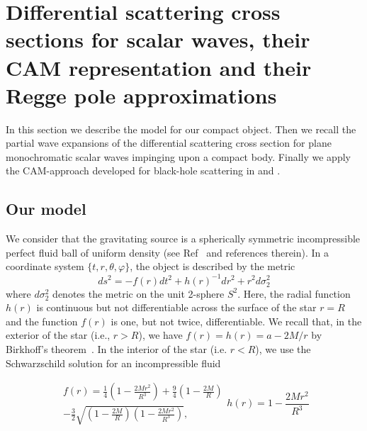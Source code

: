 \documentclass[aps,prd,longbibliography,reprint,twocolumn,amsmath,amssymb,amsfonts,showpacs,superscriptaddress]{revtex4-1}%
\begin{document}
\section{Differential scattering cross sections for scalar waves, their CAM representation and their Regge pole approximations}
\label{SecII}


In this section we describe the model for our compact object. Then we recall the partial wave expansions of the differential scattering cross section for plane monochromatic scalar waves impinging upon a compact body. Finally we apply the CAM-approach developed for black-hole scattering in \cite{Folacci:2019cmc} and \cite{Folacci:2019vtt}.

\subsection{Our model}
\label{SecIIa}

  We consider that the gravitating source is a spherically symmetric incompressible perfect fluid ball of uniform
density (see Ref~\cite{Dolan:2017rtj} and references therein). In a coordinate system $\{t,r,\theta,\varphi\}$, the object is described by the metric
\begin{equation}\label{Line_elem}
  ds^2= -f(r) dt^2+h(r)^{-1}dr^2+r^2d\sigma_2^2
\end{equation}
where $d\sigma_2^2$ denotes the metric on the unit 2-sphere $S^2$. Here, the radial function $h(r)$ is continuous but not differentiable across the surface of the star $r=R$ and the function $f(r)$ is one, but not twice, differentiable. We recall that, in the exterior of the star (i.e., $r>R$), we have $f(r)=h(r)=a-2M/r$ by Birkhoff's theorem~\cite{VojeJohansen:2005nd}. In the interior of the star (i.e. $r<R$), we use the Schwarzschild solution for an incompressible fluid~\cite{Shapiro1983}

\begin{subequations}\label{Interior_Solution}
\begin{align}\label{Interior_Solution_f}
    f(r) =\frac{1}{4}\left(1-\frac{2 M r^2}{R^3}\right)+\frac{9}{4}\left(1-\frac{2M}{R}\right) \nonumber\\ -\frac{3}{2}
                \sqrt{\left(1-\frac{2M}{R}\right)\left(1-\frac{2 M r^2}{R^3}\right)},
\end{align}
\begin{equation}\label{Interior_Solution_h}
 h(r) =1-\frac{2 M r^2}{R^3}
\end{equation}
\end{subequations}
\end{document}
